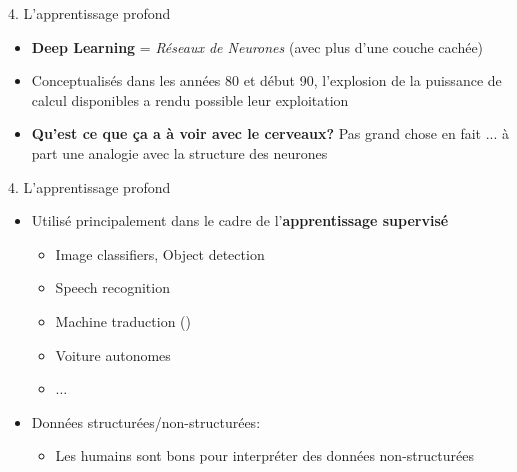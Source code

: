 \begin{frame}{4. L'apprentissage profond}
  \begin{itemize}
  \item \textbf{Deep Learning} = \textit{Réseaux de Neurones} (avec plus d'une couche cachée)
  \item Conceptualisés dans les années 80 et début 90, l'explosion de la puissance de calcul disponibles a rendu possible leur exploitation
  \item \textbf{Qu'est ce que ça a à voir avec le cerveaux?} Pas grand chose en fait ... à part une analogie avec la structure des neurones
  \end{itemize}
\end{frame}

\begin{frame}{4. L'apprentissage profond}
  \begin{itemize}
  \item Utilisé principalement dans le cadre de l'\textbf{apprentissage supervisé}
    \begin{itemize}
      \normalsize
    \item Image classifiers, Object detection
    \item Speech recognition
    \item Machine traduction (\href{https://www.deepl.com/translator}{\color{blue}{DeepL}})
    \item Voiture autonomes
    \item $\dots$
    \end{itemize}
  \item Données structurées/non-structurées:
    \begin{itemize}
      \normalsize
    \item Les humains sont bons pour interpréter des données non-structurées
    \end{itemize}
  \end{itemize}
\end{frame}

